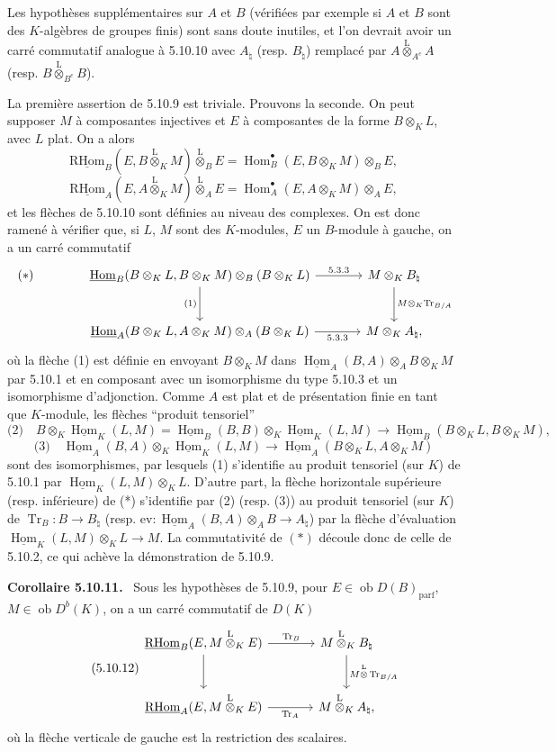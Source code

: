 \documentclass[11pt]{article}
\newenvironment{statement}[1]{\par\medskip\noindent\textbf{#1.}\ }{\par\medskip}
\DeclareMathOperator{\Hom}{Hom}
\newcommand{\ob}{\operatorname{ob}}
\providecommand{\RHom}{\mathrm{RHom}}
\providecommand{\uRHom}{\underline{\RHom}}
\providecommand{\uHom}{\underline{\Hom}}
\providecommand{\Tr}{\operatorname{Tr}}
\providecommand{\Tr}{\operatorname{Tr}}
\providecommand{\lten}{\overset{\mathrm L}{\otimes}}
\providecommand{\Tr}{\operatorname{Tr}}
\providecommand{\RHom}{\mathrm{RHom}}
\providecommand{\Hom}{\operatorname{Hom}}
\providecommand{\ob}{\operatorname{ob}}
\providecommand{\lten}{\overset{\mathrm L}{\otimes}}
\providecommand{\RHom}{\mathrm R\mathcal{H}om}
\providecommand{\lten}{\overset{\mathrm L}{\otimes}}
\providecommand{\Tr}{\operatorname{Tr}}
\providecommand{\lten}{\overset{\mathrm L}{\otimes}}
\providecommand{\lten}{\overset{\mathrm L}{\otimes}}
\providecommand{\lten}{\overset{\mathrm L}{\otimes}}
\providecommand{\RHom}{\mathrm{RHom}}
\providecommand{\Hom}{\operatorname{Hom}}
\providecommand{\Tr}{\operatorname{Tr}}
\providecommand{\lten}{\overset{\mathrm L}{\otimes}}
\begin{document}
Les hypothèses supplémentaires sur $A$ et $B$ (vérifiées par exemple si $A$ et $B$ sont des $K$-algèbres de groupes finis) sont sans doute inutiles, et l'on devrait avoir un carré commutatif analogue à 5.10.10 avec $A_\natural$ (resp. $B_\natural$) remplacé par $A\lten_{A^e}A$ (resp. $B\lten_{B^e}B$).

La première assertion de 5.10.9 est triviale. Prouvons la seconde. On peut supposer $M$ à composantes injectives et $E$ à composantes de la forme $B\otimes_KL$, avec $L$ plat. On a alors
\[
\uRHom_B(E,B\lten_KM)\lten_BE=\Hom_B^\bullet(E,B\otimes_KM)\otimes_BE,
\]
\[
\uRHom_A(E,A\lten_KM)\lten_AE=\Hom_A^\bullet(E,A\otimes_KM)\otimes_AE,
\]
et les flèches de 5.10.10 sont définies au niveau des complexes. On est donc ramené à vérifier que, si $L$, $M$ sont des $K$-modules, $E$ un $B$-module à gauche, on a un carré commutatif
\[
\begin{tikzcd}[column sep=large,row sep=large]
|[alias=star]| {(*)} & \uHom_B(B\otimes_KL,B\otimes_KM)\otimes_B(B\otimes_KL) \arrow[r,"5.3.3"] \arrow[d,"(1)"'] & M\otimes_KB_\natural \arrow[d,"M\otimes_K\Tr_{B/A}"]\\
& \uHom_A(B\otimes_KL,A\otimes_KM)\otimes_A(B\otimes_KL) \arrow[r,"5.3.3"'] & M\otimes_KA_\natural,
\end{tikzcd}
\]
où la flèche (1) est définie en envoyant $B\otimes_KM$ dans $\uHom_A(B,A)\otimes_AB\otimes_KM$ par 5.10.1 et en composant avec un isomorphisme du type 5.10.3 et un isomorphisme d'adjonction. Comme $A$ est plat et de présentation finie en tant que $K$-module, les flèches ``produit tensoriel''
\[
\text{(2)}\quad B\otimes_K\uHom_K(L,M)=\uHom_B(B,B)\otimes_K\uHom_K(L,M)\to\uHom_B(B\otimes_KL,B\otimes_KM),
\]
\[
\text{(3)}\quad \uHom_A(B,A)\otimes_K\uHom_K(L,M)\to\uHom_A(B\otimes_KL,A\otimes_KM)
\]
sont des isomorphismes, par lesquels (1) s'identifie au produit tensoriel (sur $K$) de 5.10.1 par $\uHom_K(L,M)\otimes_KL$. D'autre part, la flèche horizontale supérieure (resp. inférieure) de (*) s'identifie par (2) (resp. (3)) au produit tensoriel (sur $K$) de $\Tr_B:B\to B_\natural$ (resp. $\mathrm{ev}:\uHom_A(B,A)\otimes_AB\to A_\natural$) par la flèche d'évaluation $\uHom_K(L,M)\otimes_KL\to M$. La commutativité de $(*)$ découle donc de celle de 5.10.2, ce qui achève la démonstration de 5.10.9.

\begin{statement}{Corollaire 5.10.11}
Sous les hypothèses de 5.10.9, pour $E\in\ob D(B)_{\mathrm{parf}}$, $M\in\ob D^b(K)$, on a un carré commutatif de $D(K)$
\begin{equation}\tag{5.10.12}
\begin{tikzcd}[column sep=large,row sep=large]
\uRHom_B(E,M\lten_KE) \arrow[r,"\Tr_B"] \arrow[d] & M\lten_KB_\natural \arrow[d,"M\lten\Tr_{B/A}"]\\
\uRHom_A(E,M\lten_KE) \arrow[r,"\Tr_A"'] & M\lten_KA_\natural,
\end{tikzcd}
\end{equation}
où la flèche verticale de gauche est la restriction des scalaires.
\end{statement}
\end{document}
